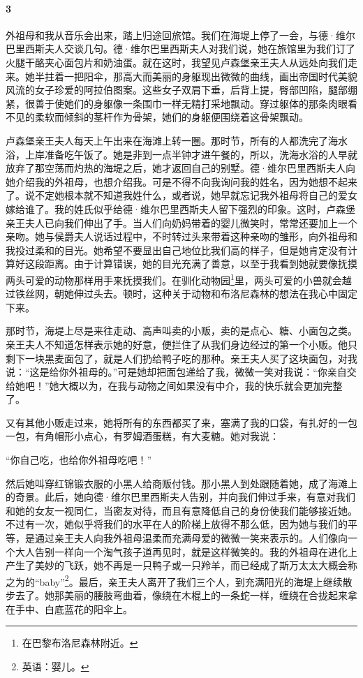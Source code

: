 \paragraph*{3}

\par 外祖母和我从音乐会出来，踏上归途回旅馆。我们在海堤上停了一会，与德·维尔巴里西斯夫人交谈几句。德·维尔巴里西斯夫人对我们说，她在旅馆里为我们订了火腿干酪夹心面包片和奶油蛋。就在这时，我望见卢森堡亲王夫人从远处向我们走来。她半拄着一把阳伞，那高大而美丽的身躯现出微微的曲线，画出帝国时代美貌风流的女子珍爱的阿拉伯图案。这些女子双肩下垂，后背上提，臀部凹陷，腿部绷紧，很善于使她们的身躯像一条围巾一样无精打采地飘动。穿过躯体的那条肉眼看不见的柔软而倾斜的茎杆作为骨架，她们的身躯便围绕着这骨架飘动。
\par 卢森堡亲王夫人每天上午出来在海滩上转一圈。那时节，所有的人都洗完了海水浴，上岸准备吃午饭了。她是非到一点半钟才进午餐的，所以，洗海水浴的人早就放弃了那空荡而灼热的海堤之后，她才返回自己的别墅。德·维尔巴里西斯夫人向她介绍我的外祖母，也想介绍我。可是不得不向我询问我的姓名，因为她想不起来了。说不定她根本就不知道我姓什么，或者说，她早就忘记我外祖母将自己的爱女嫁给谁了。我的姓氏似乎给德·维尔巴里西斯夫人留下强烈的印象。这时，卢森堡亲王夫人已向我们伸出了手。当人们向奶妈带着的婴儿微笑时，常常还要加上一个亲吻。她与侯爵夫人说话过程中，不时转过头来带着这种亲吻的雏形，向外祖母和我投过柔和的目光。她希望不要显出自己地位比我们高的样子，但是她肯定没有计算好这段距离。由于计算错误，她的目光充满了善意，以至于我看到她就要像抚摸两头可爱的动物那样用手来抚摸我们。在驯化动物园\footnote{在巴黎布洛尼森林附近。}里，两头可爱的小兽就会越过铁丝网，朝她伸过头去。顿时，这种关于动物和布洛尼森林的想法在我心中固定下来。
\par 那时节，海堤上尽是来往走动、高声叫卖的小贩，卖的是点心、糖、小面包之类。亲王夫人不知道怎样表示她的好意，便拦住了从我们身边经过的第一个小贩。他只剩下一块黑麦面包了，就是人们扔给鸭子吃的那种。亲王夫人买了这块面包，对我说：“这是给你外祖母的。”可是她却把面包递给了我，微微一笑对我说：“你亲自交给她吧！”她大概以为，在我与动物之间如果没有中介，我的快乐就会更加完整了。
\par 又有其他小贩走过来，她将所有的东西都买了来，塞满了我的口袋，有扎好的一包一包，有角帽形小点心，有罗姆酒蛋糕，有大麦糖。她对我说：
\par “你自己吃，也给你外祖母吃吧！”
\par 然后她叫穿红锦锻衣服的小黑人给商贩付钱。那小黑人到处跟随着她，成了海滩上的奇景。此后，她向德·维尔巴里西斯夫人告别，并向我们伸过手来，有意对我们和她的女友一视同仁，当密友对待，而且有意降低自己的身份使我们能够接近她。不过有一次，她似乎将我们的水平在人的阶梯上放得不那么低，因为她与我们的平等，是通过亲王夫人向我外祖母温柔而充满母爱的微微一笑来表示的。人们像向一个大人告别一样向一个淘气孩子道再见时，就是这样微笑的。我的外祖母在进化上产生了美妙的飞跃，她不再是一只鸭子或一只羚羊，而已经成了斯万太太大概会称之为的“baby”\footnote{英语：婴儿。}。最后，亲王夫人离开了我们三个人，到充满阳光的海堤上继续散步去了。她那美丽的腰肢弯曲着，像绕在木棍上的一条蛇一样，缠绕在合拢起来拿在手中、白底蓝花的阳伞上。
